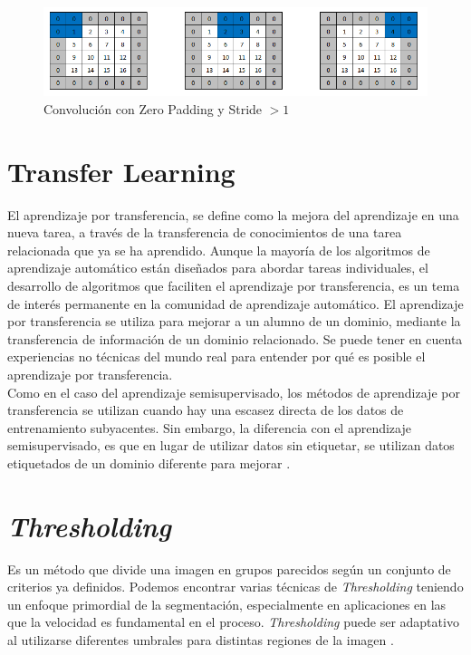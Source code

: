  \begin{figure}[ht]
 	\centering
 	\includegraphics[scale=0.5]{Figs/stride.png}
 	\caption{Convolución con Zero Padding y Stride $> 1$}
 	\label{stride}
 \end{figure}
 
 \newpage
\section{Transfer Learning}
El aprendizaje por transferencia, se define como la mejora del aprendizaje en una nueva tarea, a través de la transferencia de conocimientos de una tarea relacionada que ya se ha aprendido. Aunque la mayoría de los algoritmos de aprendizaje automático están diseñados para abordar tareas individuales, el desarrollo de algoritmos que faciliten el aprendizaje por transferencia, es un tema de interés permanente en la comunidad de aprendizaje automático. El aprendizaje por transferencia se utiliza para mejorar a un alumno de un dominio, mediante la transferencia de información de un dominio relacionado. Se puede tener en cuenta experiencias no técnicas del mundo real para entender por qué es posible el aprendizaje por transferencia.\\

Como en el caso del aprendizaje semisupervisado, los métodos de aprendizaje por transferencia se utilizan cuando hay una escasez directa de los datos de entrenamiento subyacentes. Sin embargo, la diferencia con el aprendizaje semisupervisado, es que en lugar de utilizar datos sin etiquetar, se utilizan datos etiquetados de un dominio diferente para mejorar \cite{ref_14}.

\section{\textit{Thresholding}}


Es un método que divide una imagen en grupos parecidos según un conjunto de criterios ya definidos. Podemos encontrar varias técnicas de \textit{Thresholding} teniendo un enfoque primordial de la segmentación, especialmente en aplicaciones en las que la velocidad es fundamental en el proceso. \textit{Thresholding} puede ser adaptativo al utilizarse diferentes umbrales para distintas regiones de la imagen \cite{kulkarni2012color}.



